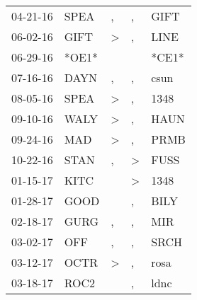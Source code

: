\begin{supertabular}{p{0.07\textwidth}p{0.06\textwidth}p{0.02\textwidth}p{0.02\textwidth}p{0.06\textwidth}}
          04-21-16\textsuperscript{} &           SPEA\textsuperscript{} &                , &                , &           GIFT\textsuperscript{} \\
          06-02-16\textsuperscript{} &           GIFT\textsuperscript{} &     \textgreater &                , &           LINE\textsuperscript{} \\
          06-29-16\textsuperscript{} &                            *OE1* &                  &                  &                            *CE1* \\
          07-16-16\textsuperscript{} &           DAYN\textsuperscript{} &                , &                , &           csun\textsuperscript{} \\
          08-05-16\textsuperscript{} &           SPEA\textsuperscript{} &     \textgreater &                , &           1348\textsuperscript{} \\
          09-10-16\textsuperscript{} &           WALY\textsuperscript{} &     \textgreater &                , &           HAUN\textsuperscript{} \\
          09-24-16\textsuperscript{} &            MAD\textsuperscript{} &     \textgreater &                , &           PRMB\textsuperscript{} \\
          10-22-16\textsuperscript{} &           STAN\textsuperscript{} &                , &     \textgreater &           FUSS\textsuperscript{} \\
          01-15-17\textsuperscript{} &           KITC\textsuperscript{} &                  &     \textgreater &           1348\textsuperscript{} \\
          01-28-17\textsuperscript{} &           GOOD\textsuperscript{} &                  &                , &           BILY\textsuperscript{} \\
          02-18-17\textsuperscript{} &           GURG\textsuperscript{} &                , &                , &            MIR\textsuperscript{} \\
          03-02-17\textsuperscript{} &            OFF\textsuperscript{} &                , &                , &           SRCH\textsuperscript{} \\
          03-12-17\textsuperscript{} &           OCTR\textsuperscript{} &     \textgreater &                , &           rosa\textsuperscript{} \\
          03-18-17\textsuperscript{} &           ROC2\textsuperscript{} &                  &                , &           ldnc\textsuperscript{} \\

\end{supertabular}
